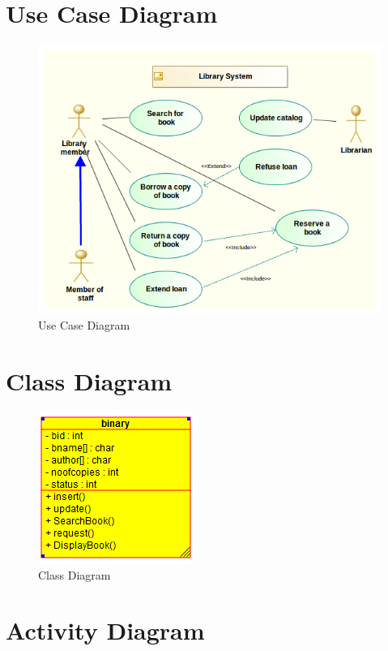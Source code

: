 \documentclass[a4paper,12pt]{article}
\begin{document}
\newpage

\section{Use Case Diagram}
	\begin{figure}[h!]
		\centering
		\includegraphics[scale=0.50]{use_case.png}
		\caption{Use Case Diagram}
		\label{Use Case Diagram}
	\end{figure}

\section{Class Diagram}
	
\begin{figure}[htb!]
		\centering
		\includegraphics[scale = 0.80]{bst-class}
		\caption{Class Diagram}
		\label{Class Diagram}
		\end{figure}

\newpage

\section{Activity Diagram}
	
\end{document}
